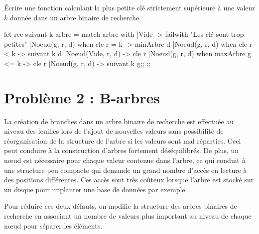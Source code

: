 \begin{question}{}{}
Écrire une fonction calculant la plus petite clé strictement supérieure à une valeur $k$ donnée dans un arbre binaire de recherche. %
\reponse
\begin{ocaml}
let rec suivant k arbre =
   match arbre with
   |Vide -> failwith "Les clé sont trop petites"
   |Noeud(g, r, d) when cle r = k  -> minArbre d
   |Noeud(g, r, d) when cle r < k -> suivant k d
   |Noeud(Vide, r, d) -> cle r
   |Noeud(g, r, d) when maxArbre g <= k -> cle r
   |Noeud(g, r, d) -> suivant k g;;
;;
\end{ocaml}
\end{question}
\section{Problème 2 : B-arbres }
La création de branches dans un arbre binaire de recherche est effectuée au niveau des feuilles lors de l’ajout de nouvelles valeurs sans possibilité de réorganisation de la structure de l’arbre si les valeurs sont mal réparties. Ceci peut conduire à la construction d’arbres fortement déséquilibrés. De plus, un nœud est nécessaire pour chaque valeur contenue dans l’arbre, ce qui conduit à une structure peu compacte qui demande un grand nombre d’accès en lecture à des positions différentes. Ces accès sont très coûteux lorsque l’arbre est stocké sur un disque pour implanter une base de données par exemple.

Pour réduire ces deux défauts, on modifie la structure des arbres binaires de recherche en associant un nombre de valeurs plus important au niveau de chaque nœud pour séparer les éléments.

